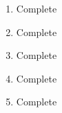 \documentclass[11pt]{article}
\begin{document}

\begin{enumerate}[1)]
	\item Complete
	\item Complete
	\item Complete
	\item Complete
	\item Complete
\end{enumerate}
\end{document}
